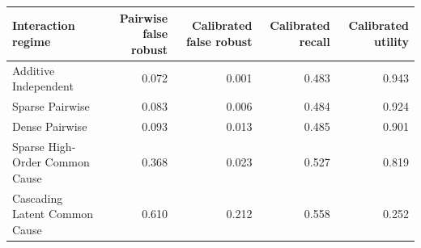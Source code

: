 \begin{tabular}{lrrrr}
\toprule
Interaction regime & Pairwise false robust & Calibrated false robust & Calibrated recall & Calibrated utility \\
\midrule
Additive Independent & 0.072 & 0.001 & 0.483 & 0.943 \\
Sparse Pairwise & 0.083 & 0.006 & 0.484 & 0.924 \\
Dense Pairwise & 0.093 & 0.013 & 0.485 & 0.901 \\
Sparse High-Order Common Cause & 0.368 & 0.023 & 0.527 & 0.819 \\
Cascading Latent Common Cause & 0.610 & 0.212 & 0.558 & 0.252 \\
\bottomrule
\end{tabular}
